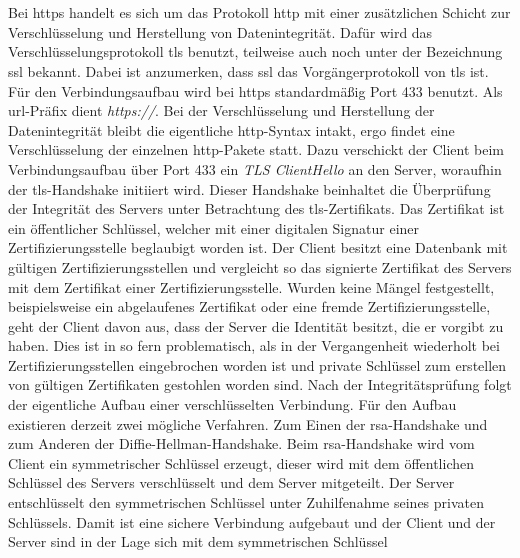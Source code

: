 \documentclass[titlepage]{report}
\begin{document}
\section*{}
Bei \gls{https} handelt es sich um das Protokoll \gls{http} mit einer
zusätzlichen Schicht zur Verschlüsselung und Herstellung von
Datenintegrität. Dafür wird das Verschlüsselungsprotokoll \gls{tls}
benutzt, teilweise auch noch unter der Bezeichnung \gls{ssl} bekannt.
Dabei ist anzumerken, dass \gls{ssl} das Vorgängerprotokoll von
\gls{tls} ist.
Für den Verbindungsaufbau wird bei \gls{https} standardmäßig
Port 433 benutzt\cite[Siehe Section 2.3]{RFC2818}. Als
\gls{url}\hyp{}Präfix dient \emph{https://}. Bei der Verschlüsselung und
Herstellung der Datenintegrität bleibt die eigentliche
\gls{http}\hyp{}Syntax intakt, ergo findet eine Verschlüsselung der
einzelnen \gls{http}\hyp{}Pakete statt. Dazu verschickt der Client beim
Verbindungsaufbau über Port 433 ein \emph{TLS ClientHello} an den
Server, woraufhin der \gls{tls}\hyp{}Handshake initiiert wird.
Dieser Handshake beinhaltet die Überprüfung der Integrität des Servers
unter Betrachtung des \gls{tls}\hyp{}Zertifikats. Das Zertifikat ist
ein öffentlicher Schlüssel, welcher mit einer
digitalen Signatur einer Zertifizierungsstelle beglaubigt worden ist.
Der Client besitzt eine Datenbank mit gültigen Zertifizierungsstellen
und vergleicht so das signierte Zertifikat des Servers mit dem
Zertifikat einer Zertifizierungsstelle. Wurden keine Mängel
festgestellt, beispielsweise ein abgelaufenes Zertifikat oder eine
fremde Zertifizierungsstelle, geht der Client davon aus, dass der Server
die Identität besitzt, die er vorgibt zu haben. Dies ist in so fern
problematisch, als in der Vergangenheit wiederholt bei
Zertifizierungsstellen eingebrochen worden ist und private Schlüssel zum
erstellen von gültigen Zertifikaten gestohlen worden
sind\cite{PRIVATEKEYSSTOLEN}. Nach der Integritätsprüfung folgt der
eigentliche Aufbau einer verschlüsselten Verbindung. Für den Aufbau
existieren derzeit zwei mögliche Verfahren. Zum Einen der
\gls{rsa}\hyp{}Handshake und zum Anderen der
Diffie\hyp{}Hellman\hyp{}Handshake\cite{TLS}. Beim
\gls{rsa}\hyp{}Handshake wird vom Client ein symmetrischer Schlüssel
erzeugt, dieser wird mit dem öffentlichen Schlüssel des Servers
verschlüsselt und dem Server mitgeteilt. Der Server entschlüsselt den
symmetrischen Schlüssel unter Zuhilfenahme seines privaten Schlüssels.
Damit ist eine sichere Verbindung aufgebaut und der Client und der Server
sind in der Lage sich mit dem symmetrischen Schlüssel
\end{document}
